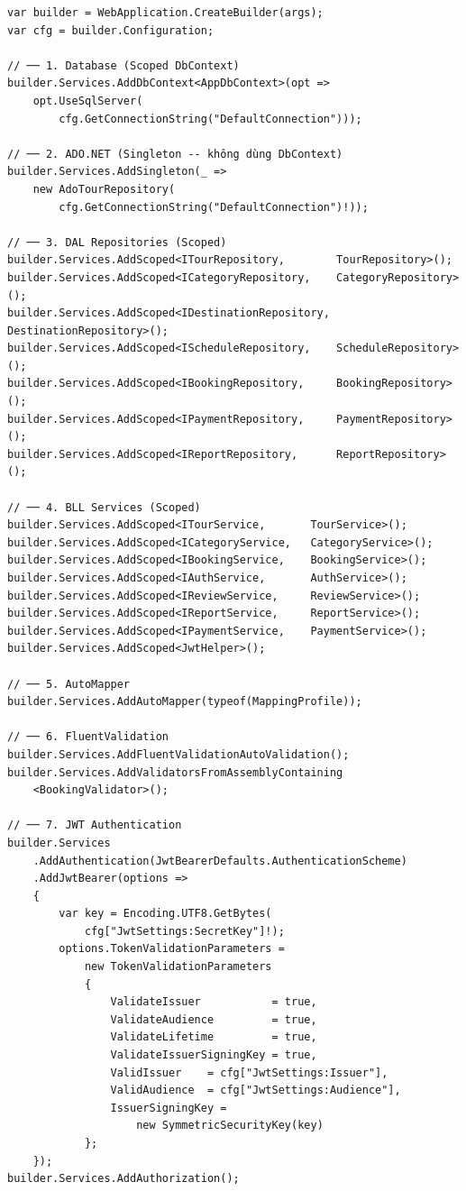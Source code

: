 \begin{lstlisting}[style=csharp,
  caption={Program.cs -- đăng ký DI đầy đủ của hệ thống},
  label={lst:di}]
var builder = WebApplication.CreateBuilder(args);
var cfg = builder.Configuration;

// ── 1. Database (Scoped DbContext)
builder.Services.AddDbContext<AppDbContext>(opt =>
    opt.UseSqlServer(
        cfg.GetConnectionString("DefaultConnection")));

// ── 2. ADO.NET (Singleton -- không dùng DbContext)
builder.Services.AddSingleton(_ =>
    new AdoTourRepository(
        cfg.GetConnectionString("DefaultConnection")!));

// ── 3. DAL Repositories (Scoped)
builder.Services.AddScoped<ITourRepository,        TourRepository>();
builder.Services.AddScoped<ICategoryRepository,    CategoryRepository>();
builder.Services.AddScoped<IDestinationRepository, DestinationRepository>();
builder.Services.AddScoped<IScheduleRepository,    ScheduleRepository>();
builder.Services.AddScoped<IBookingRepository,     BookingRepository>();
builder.Services.AddScoped<IPaymentRepository,     PaymentRepository>();
builder.Services.AddScoped<IReportRepository,      ReportRepository>();

// ── 4. BLL Services (Scoped)
builder.Services.AddScoped<ITourService,       TourService>();
builder.Services.AddScoped<ICategoryService,   CategoryService>();
builder.Services.AddScoped<IBookingService,    BookingService>();
builder.Services.AddScoped<IAuthService,       AuthService>();
builder.Services.AddScoped<IReviewService,     ReviewService>();
builder.Services.AddScoped<IReportService,     ReportService>();
builder.Services.AddScoped<IPaymentService,    PaymentService>();
builder.Services.AddScoped<JwtHelper>();

// ── 5. AutoMapper
builder.Services.AddAutoMapper(typeof(MappingProfile));

// ── 6. FluentValidation
builder.Services.AddFluentValidationAutoValidation();
builder.Services.AddValidatorsFromAssemblyContaining
    <BookingValidator>();

// ── 7. JWT Authentication
builder.Services
    .AddAuthentication(JwtBearerDefaults.AuthenticationScheme)
    .AddJwtBearer(options =>
    {
        var key = Encoding.UTF8.GetBytes(
            cfg["JwtSettings:SecretKey"]!);
        options.TokenValidationParameters =
            new TokenValidationParameters
            {
                ValidateIssuer           = true,
                ValidateAudience         = true,
                ValidateLifetime         = true,
                ValidateIssuerSigningKey = true,
                ValidIssuer    = cfg["JwtSettings:Issuer"],
                ValidAudience  = cfg["JwtSettings:Audience"],
                IssuerSigningKey =
                    new SymmetricSecurityKey(key)
            };
    });
builder.Services.AddAuthorization();


\end{lstlisting}
